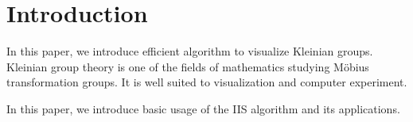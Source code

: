 
\section{Introduction}

In this paper, we introduce efficient algorithm to visualize Kleinian
groups.
Kleinian group theory is one of the fields of mathematics studying 
M\"obius transformation groups.
It is well suited to visualization and computer experiment.


In this paper, we introduce basic usage of the IIS algorithm and its
applications.


